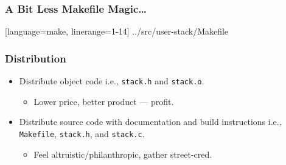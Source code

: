 \begin{frame}[fragile]

\frametitle{A Bit Less Makefile Magic\ldots}

%
  [language=make, linerange={1-14}]%
  {../src/user-stack/Makefile}

\end{frame}


\begin{frame}

\frametitle{Distribution}

\begin{itemize}

\item Distribute object code i.e., \texttt{stack.h} and \texttt{stack.o}.

\begin{itemize}

\item Lower price, better product --- profit.

\end{itemize}

\item Distribute source code with documentation and build instructions i.e.,
\texttt{Makefile}, \texttt{stack.h}, and \texttt{stack.c}.

\begin{itemize}

\item Feel altruistic/philanthropic, gather street-cred.

\end{itemize}

\end{itemize}

\end{frame}
